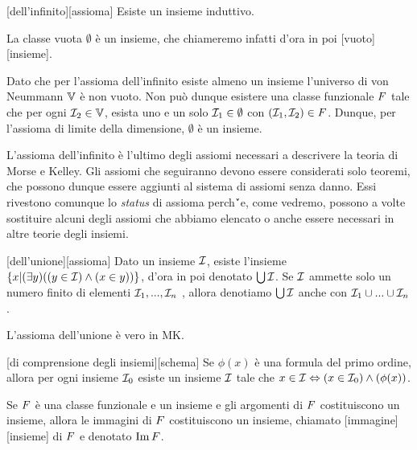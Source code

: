 \begin{Axiom}
	[dell'infinito][assioma] Esiste un insieme induttivo.
\end{Axiom}
\begin{Theorem}
	La classe vuota $\emptyset$ \`e un insieme, che chiameremo infatti d'ora in poi [vuoto][insieme].
\end{Theorem}
\Proof Dato che per l'assioma dell'infinito esiste almeno un insieme l'universo di von Neummann $\mathbb{V}$ \`e non vuoto. Non pu\`o dunque esistere una classe funzionale $F$ tale che per ogni $\mathcal{I}_2 \in \mathbb{V}$, esista uno e un solo $\mathcal{I}_1 \in \emptyset$ con $(\mathcal{I}_1,\mathcal{I}_2) \in F$. Dunque, per l'assioma di limite della dimensione, $\emptyset$ \`e un insieme. \EndProof
\par L'assioma dell'infinito \`e l'ultimo degli assiomi necessari a descrivere la teoria di Morse e Kelley. Gli assiomi che seguiranno devono essere considerati solo teoremi, che possono dunque essere aggiunti al sistema di assiomi senza danno. Essi rivestono comunque lo \textit{status} di assioma perch\'`e, come vedremo, possono a volte sostituire alcuni degli assiomi che abbiamo elencato o anche essere necessari in altre teorie degli insiemi.
\begin{Axiom}
	[dell'unione][assioma] Dato un insieme $\mathcal{I}$, esiste l'insieme $\lbrace x | (\exists y)(\left ( y \in \mathcal{I} \right ) \wedge \left ( x \in y \right )) \rbrace$, d'ora in poi denotato $\bigcup \mathcal{I}$. Se $\mathcal{I}$ ammette solo un numero finito di elementi $\mathcal{I}_1, ..., \mathcal{I}_n$ , allora denotiamo $\bigcup \mathcal{I}$ anche con $\mathcal{I}_1 \cup ... \cup \mathcal{I}_n$.
\end{Axiom}
\begin{Theorem}
	L'assioma dell'unione \`e vero in MK.
\end{Theorem}
\begin{Axiom}
	[di comprensione degli insiemi][schema] Se $\phi(x)$ \`e una formula del primo ordine, allora per ogni insieme $\mathcal{I}_0$ esiste un insieme $\mathcal{I}$ tale che $x \in \mathcal{I} \Leftrightarrow \left ( x \in \mathcal{I}_0 \right ) \wedge \left ( \phi(x) \right )$.
\end{Axiom}
\begin{Axiom}
	 Se $F$ \`e una classe funzionale e un insieme e gli argomenti di $F$ costituiscono un insieme, allora le immagini di $F$ costituiscono un insieme, chiamato [immagine][insieme] di $F$ e denotato $\operatorname{Im}{F}$.
\end{Axiom}
